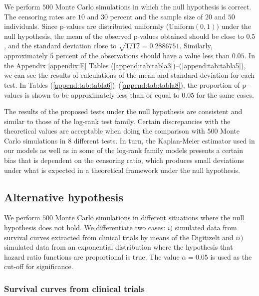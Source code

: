 \documentclass[11pt]{article}
\begin{document}
We perform $500$ Monte Carlo simulations in which the null hypothesis is correct. The censoring rates are $10$ and $30$ percent and the sample size of $20$ and $50$ individuals. Since  p-values  are distributed uniformly ($\text{Uniform}(0,1))$ under the null hypothesis, the mean of the observed p-values obtained should be close to $0.5$, and the standard deviation close to $\sqrt{1/12}=0.2886751$. Similarly, approximately $5$ percent of the observations should have a value less than $0.05$. In the Appendix \ref{appendix:E} Tables (\ref{append:tab:tabla3})--(\ref{append:tab:tabla5}),  we can see the results of calculations of the mean and standard deviation for each test. In  Tables (\ref{append:tab:tabla6})--(\ref{append:tab:tabla8}),  the proportion of p-values is shown to be approximately  less  than or equal to $0.05$ for the same cases.





The results of the proposed tests under the null hypothesis are consistent and similar to those of the log-rank test family.
 Certain discrepancies with the theoretical values  are acceptable when doing the comparison with $500$ Monte Carlo simulations in $8$ different tests. In turn, the Kaplan-Meier estimator used in our models as well as in some of the log-rank family models presents a certain bias that is dependent on the censoring ratio, which produces small deviations under what is expected in a theoretical framework under the null hypothesis. 










\subsection{Alternative hypothesis}


We perform $500$ Monte Carlo simulations in different situations where  the null hypothesis does not hold. We  differentiate two cases: $i)$ simulated data from survival curves extracted from clinical trials 
by means of the Digitizelt  and $ii)$ simulated data from an exponential distribution where the hypothesis that hazard ratio functions are proportional is true. The value $\alpha = 0.05$ is used as the cut-off for significance.







\subsubsection{Survival curves from clinical trials}
\end{document}
